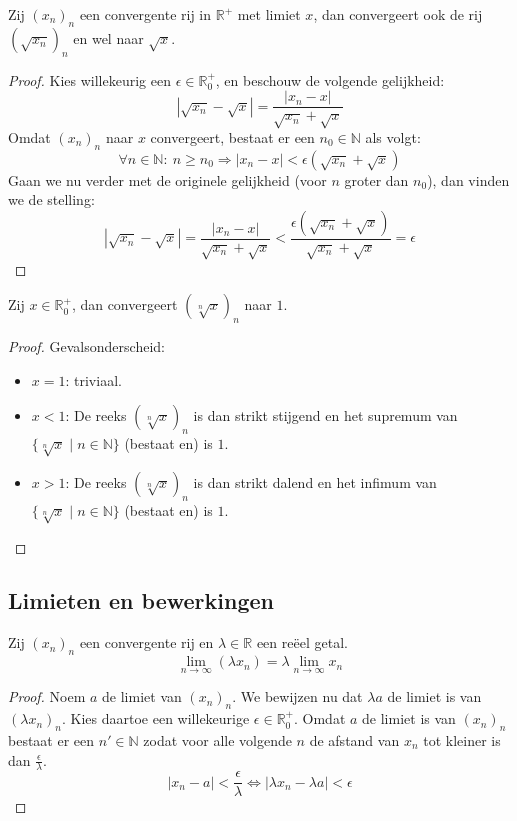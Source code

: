 \documentclass[main.tex]{subfiles}
\begin{document}
\begin{st}
  Zij $(x_{n})_{n}$ een convergente rij in $\mathbb{R}^{+}$ met limiet $x$, dan convergeert ook de rij $\left(\sqrt{x_{n}}\right)_{n}$ en wel naar $\sqrt{x}$.

  \begin{proof}
    Kies willekeurig een $\epsilon\in\mathbb{R}_{0}^{+}$, en beschouw de volgende gelijkheid:
    \[ |\sqrt{x_{n}}-\sqrt{x}| = \frac{|x_{n}-x|}{\sqrt{x_{n}} + \sqrt{x}} \]
    Omdat $(x_{n})_{n}$ naar $x$ convergeert, bestaat er een $n_{0}\in\mathbb{N}$ als volgt:
    \[ \forall n\in\mathbb{N}:\ n \ge n_{0} \Rightarrow |x_{n}-x| < \epsilon\left(\sqrt{x_{n}}+\sqrt{x}\right) \]
    Gaan we nu verder met de originele gelijkheid (voor $n$ groter dan $n_{0}$), dan vinden we de stelling:
    \[ |\sqrt{x_{n}}-\sqrt{x}| = \frac{|x_{n}-x|}{\sqrt{x_{n}} + \sqrt{x}} < \frac{\epsilon\left(\sqrt{x_{n}}+\sqrt{x}\right)}{\sqrt{x_{n}} + \sqrt{x}} = \epsilon \]
  \end{proof}
\end{st}

\begin{st}
  Zij $x\in\mathbb{R}_{0}^{+}$, dan convergeert $(\sqrt[n]{x})_{n}$ naar $1$.

  \begin{proof}
    Gevalsonderscheid:
    \begin{itemize}
    \item $x=1$: triviaal.
    \item $x < 1$:
      De reeks $(\sqrt[n]{x})_{n}$ is dan strikt stijgend en het supremum van $\{ \sqrt[n]{x} \mid n\in\mathbb{N} \}$ (bestaat en) is $1$.
    \item $x > 1$:
      De reeks $(\sqrt[n]{x})_{n}$ is dan strikt dalend en het infimum van $\{ \sqrt[n]{x} \mid n\in\mathbb{N} \}$ (bestaat en) is $1$.
    \end{itemize}
  \end{proof}
\end{st}


\subsection{Limieten en bewerkingen}
\label{sec:limi-en-bewerk}

\begin{bst}
  Zij $(x_{n})_{n}$ een convergente rij en $\lambda\in \mathbb{R}$ een re\"eel getal.
  \[ \lim_{n \rightarrow \infty}(\lambda x_{n}) = \lambda \lim_{n\rightarrow \infty}x_{n} \]

  \begin{proof}
    Noem $a$ de limiet van $(x_{n})_{n}$.
    We bewijzen nu dat $\lambda a$ de limiet is van $(\lambda x_{n})_{n}$.
    Kies daartoe een willekeurige $\epsilon \in \mathbb{R}_{0}^{+}$.
    Omdat $a$ de limiet is van $(x_{n})_{n}$ bestaat er een $n'\in \mathbb{N}$ zodat voor alle volgende $n$ de afstand van $x_{n}$ tot kleiner is dan $\frac{\epsilon}{\lambda}.$
    \[ |x_{n}-a| < \frac{\epsilon}{\lambda} \Leftrightarrow |\lambda x_{n}-\lambda a| < \epsilon \]
  \end{proof}
\end{bst}
\end{document}
